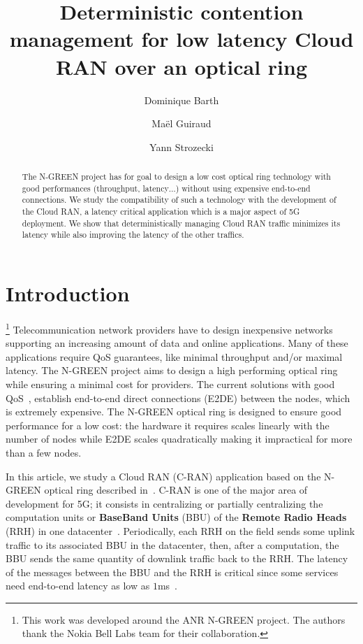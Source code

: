 \documentclass[10pt, conference, letterpaper]{IEEEtran}
\title{Deterministic contention management for low latency Cloud RAN over an optical ring}
\author[1]{Dominique Barth}
\author[1,2]{Ma\"el Guiraud}
\author[1]{Yann Strozecki}
\affil[1]{David Laboratory, UVSQ}
\affil[2]{Nokia Bell Labs France}
\begin{document}
\maketitle


\begin{abstract}
The N-GREEN project has for goal to design a low cost optical ring technology with good performances (throughput, latency$\dots$) without using expensive end-to-end connections. We study the compatibility of such a technology with the development of the Cloud RAN, a latency critical application which is a major aspect of 5G deployment. We show that deterministically managing Cloud RAN traffic minimizes its latency while also improving the latency of the other traffics. 

\end{abstract}


\section{Introduction}

\footnote{This work was developed around the ANR N-GREEN project. The authors thank the Nokia Bell Labs team for their collaboration.} Telecommunication network providers have to design inexpensive networks supporting an increasing amount of data and online applications. Many of these applications require QoS guarantees, like minimal throughput and/or  maximal latency. The N-GREEN project aims to design a high performing optical ring while ensuring a minimal cost for providers. The current solutions with good QoS~\cite{pizzinat2015things,tayq2017real}, establish end-to-end direct connections (E2DE) between the nodes, which is extremely expensive. The N-GREEN optical ring is designed to ensure good performance for a low cost: the hardware it requires scales linearly with the number of nodes while E2DE scales quadratically making it impractical for more than a few nodes.


In this article, we study a Cloud RAN (C-RAN) application based on the N-GREEN optical ring described in~\cite{ngreenarchitecture,uscumlic2018scalable}. C-RAN is one of the major area of development for 5G; it consists in centralizing or partially centralizing the computation units or {\bf BaseBand Units} (BBU) of the {\bf Remote Radio Heads} (RRH) in one datacenter~\cite{mobile2011c}. Periodically, each RRH on the field sends some uplink traffic to its associated BBU in the datacenter, then, after a computation, the BBU sends the same quantity of downlink traffic back to the RRH. The latency of the messages between the BBU and the RRH is critical since some services need end-to-end latency as low as $1$ms~\cite{3gpp5g,boccardi2014five}.
\end{document}
